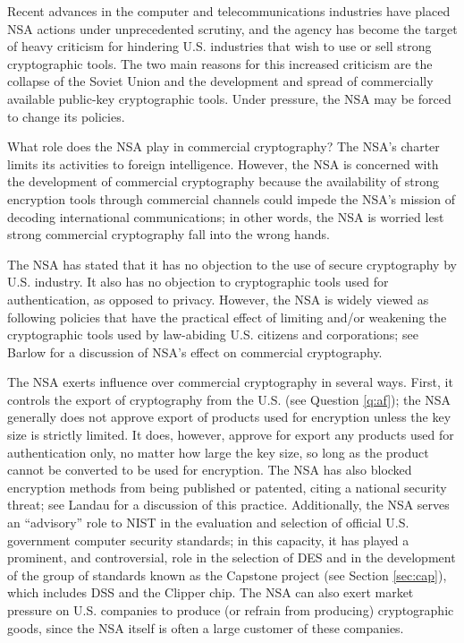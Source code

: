 Recent advances in the computer and telecommunications industries have 
placed NSA actions under unprecedented scrutiny, and the agency has become 
the target of heavy criticism for hindering U.S. industries that wish to use 
or sell strong cryptographic tools. The two main reasons for this increased 
criticism are the collapse of the Soviet Union and the development and 
spread of commercially available public-key cryptographic tools. Under 
pressure, the NSA may be forced to change its policies.

{What role does the NSA play in commercial cryptography?}
The NSA's charter limits its activities to foreign intelligence. However,
the NSA is concerned with the development of commercial cryptography
because the availability of strong encryption tools through commercial 
channels could impede the NSA's mission of decoding international 
communications; in other words, the NSA is worried lest strong commercial 
cryptography fall into the wrong hands. 

The NSA has stated that it has no objection to the use of secure cryptography
by U.S. industry. It also has no objection to cryptographic tools used for
authentication, as opposed to privacy. However, the NSA is widely viewed as
following policies that have the practical effect of limiting and/or weakening
the cryptographic tools used by law-abiding U.S. citizens and corporations;
see Barlow \cite{barlow} for a discussion of NSA's effect on commercial 
cryptography.

The NSA exerts influence over commercial cryptography in several ways. 
First, it controls the export of cryptography from the U.S. (see Question 
\ref{q:af}); the NSA generally does not approve export of products used 
for encryption unless the key size is strictly limited. It does, however,
approve for export any products used for authentication only, no matter 
how large the key size, so long as the product cannot be converted to be
used for encryption. The NSA has also blocked encryption methods from being 
published or patented, citing a national security threat; see Landau 
\cite{landau} for a discussion of this practice. Additionally, the NSA 
serves an ``advisory'' role to NIST in the evaluation and selection of 
official U.S. government computer security standards; in this capacity, 
it has played a prominent, and controversial, role in the selection of DES 
and in the development of the group of standards known as the Capstone 
project (see Section \ref{sec:cap}), which includes DSS and the Clipper 
chip. The NSA can also exert market pressure on U.S. companies to produce 
(or refrain from producing) cryptographic goods, since the NSA itself is 
often a large customer of these companies.

